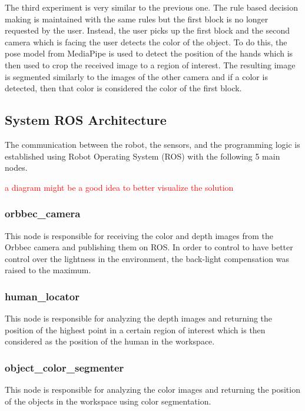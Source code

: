 The third experiment is very similar to the previous one. The rule based decision making is maintained with the same rules but the first block is no longer requested by the user. Instead, the user picks up the first block and the second camera which is facing the user detects the color of the object. To do this, the pose model from MediaPipe is used to detect the position of the hands which is then used to crop the received image to a region of interest. The resulting image is segmented similarly to the images of the other camera and if a color is detected, then that color is considered the color of the first block.

\subsection{System ROS Architecture}

The communication between the robot, the sensors, and the programming logic is established using Robot Operating System (ROS) with the following 5 main nodes.

\textcolor{red}{a diagram might be a good idea to better visualize the solution}

\subsubsection{orbbec\_camera}

This node is responsible for receiving the color and depth images from the Orbbec camera and publishing them on ROS. In order to control to have better control over the lightness in the environment, the back-light compensation was raised to the maximum.

\subsubsection{human\_locator}

This node is responsible for analyzing the depth images and returning the position of the highest point in a certain region of interest which is then considered as the position of the human in the workspace.

\subsubsection{object\_color\_segmenter}

This node is responsible for analyzing the color images and returning the position of the objects in the workspace using color segmentation.

